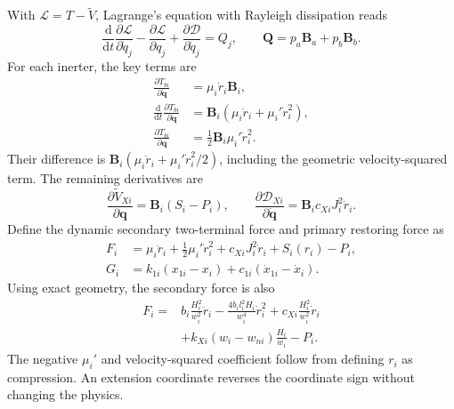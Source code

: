 \documentclass[a4paper,11pt]{article}
\numberwithin{equation}{section}
\newcommand{\bq}{\bm q}
\newcommand{\bB}{\bm B}
\newcommand{\dd}{\mathrm d}
\begin{document}
With $\mathcal L=T-\widetilde V$, Lagrange's equation with Rayleigh dissipation reads
\begin{equation}
\frac{\dd}{\dd t}\frac{\partial\mathcal L}{\partial\dot q_j}
-\frac{\partial\mathcal L}{\partial q_j}
+\frac{\partial\mathcal D}{\partial\dot q_j}=Q_j,
\qquad \bm Q=p_a\bB_a+p_b\bB_b.\label{eq:L}
\end{equation}
For each inerter, the key terms are
\begin{align}
\frac{\partial T_{bi}}{\partial\dot{\bq}}&=\mu_i\dot r_i\bB_i,\\
\frac{\dd}{\dd t}\frac{\partial T_{bi}}{\partial\dot{\bq}}
&=\bB_i(\mu_i\ddot r_i+\mu_i'\dot r_i^2),\\
\frac{\partial T_{bi}}{\partial\bq}&=\tfrac12\bB_i\mu_i'\dot r_i^2.
\end{align}
Their difference is $\bB_i(\mu_i\ddot r_i+\mu_i'\dot r_i^2/2)$, including the geometric velocity-squared term. The remaining derivatives are
\begin{equation}
\frac{\partial\widetilde V_{Xi}}{\partial\bq}=\bB_i(S_i-P_i),
\qquad \frac{\partial\mathcal D_{Xi}}{\partial\dot{\bq}}
=\bB_i c_{Xi}J_i^2\dot r_i.\label{eq:grad}
\end{equation}
Define the dynamic secondary two-terminal force and primary restoring force as
\begin{align}
F_i&=\mu_i\ddot r_i+\tfrac12\mu_i'\dot r_i^2
+c_{Xi}J_i^2\dot r_i+S_i(r_i)-P_i,\label{eq:F}\\
G_i&=k_{1i}(x_{1i}-x_i)+c_{1i}(\dot x_{1i}-\dot x_i).\label{eq:G}
\end{align}
Using exact geometry, the secondary force is also
\begin{equation}
\boxed{\begin{aligned}
F_i={}&b_i\frac{H_i^2}{w_i^2}\ddot r_i
-\frac{4b_i l_i^2H_i}{w_i^4}\dot r_i^2
+c_{Xi}\frac{H_i^2}{w_i^2}\dot r_i\\
&+k_{Xi}(w_i-w_{ni})\frac{H_i}{w_i}-P_i.
\end{aligned}}\label{eq:Ffull}
\end{equation}
The negative $\mu_i'$ and velocity-squared coefficient follow from defining $r_i$ as compression. An extension coordinate reverses the coordinate sign without changing the physics.
\end{document}
